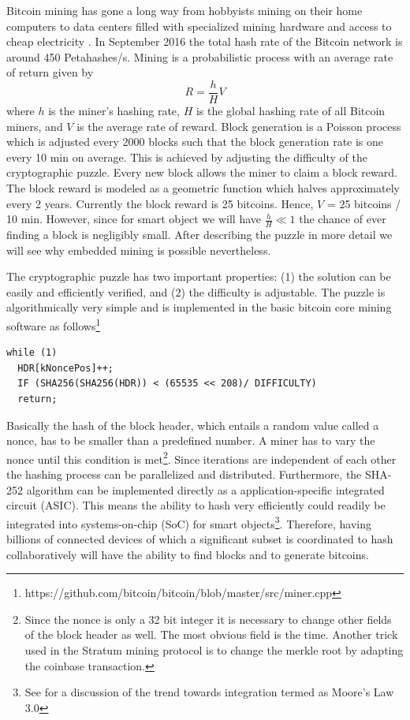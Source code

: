 \documentclass[10pt, conference,compsoc]{IEEEtran}
\begin{document}
Bitcoin mining has gone a long way from hobbyists mining on their home computers to data centers filled with specialized mining hardware and access to cheap electricity \cite{taylor2013bitcoin}. In September 2016 the total hash rate of the Bitcoin network is around 450 Petahashes/s. Mining is a probabilistic process with an average rate of return given by 
\begin{equation}
R = \frac{h}{H}V
\end{equation}
where $h$ is the miner's hashing rate, $H$ is the global hashing rate of all Bitcoin miners, and $V$ is the average rate of reward. 
Block generation is a Poisson process which is adjusted every 2000 blocks such that the block generation rate is one every 10 min on average. This is achieved by adjusting the difficulty of the cryptographic puzzle. Every new block allows the miner to claim a block reward. The block reward is modeled as a geometric function which halves approximately every 2 years. Currently the block reward is 25 bitcoins. Hence, $V$ = 25 bitcoins / 10 min. However, since for smart object we will have $\frac{h}{H} \ll 1$ the chance of ever finding a block is negligibly small. After describing the puzzle in more detail we will see why embedded mining is possible nevertheless.

The cryptographic puzzle has two important properties: (1) the solution can be easily and efficiently verified, and (2) the difficulty is adjustable. The puzzle is algorithmically very simple and is implemented in the basic bitcoin core mining software as follows\footnote{https://github.com/bitcoin/bitcoin/blob/master/src/miner.cpp}
\begin{lstlisting}[breaklines=true]
while (1)
  HDR[kNoncePos]++;
  IF (SHA256(SHA256(HDR)) < (65535 << 208)/ DIFFICULTY)
  return; 
\end{lstlisting}
Basically the hash of the block header, which entails a random value called a nonce, has to be smaller than a predefined number. A miner has to vary the nonce until this condition is met\footnote{Since the nonce is only a 32 bit integer it is necessary to change other fields of the block header as well. The most obvious field is the time. Another trick used in the Stratum mining protocol \cite{stratum} is to change the merkle root by adapting the coinbase transaction.}. Since iterations are independent of each other the hashing process can be parallelized and distributed. Furthermore, the SHA-252 algorithm can be implemented directly as a application-specific integrated circuit (ASIC). This means the ability to hash very efficiently could readily be integrated into systems-on-chip (SoC) for smart objects\footnote{See \cite{mack2015multiple} for a discussion of the trend towards integration termed as Moore's Law 3.0}. Therefore, having billions of connected devices of which a significant subset is coordinated to hash collaboratively will have the ability to find blocks and to generate bitcoins.
\end{document}
